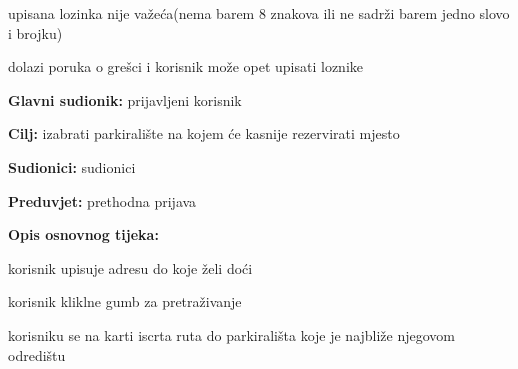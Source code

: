 \begin{packed_item}
\begin{packed_item}
\begin{packed_enum}
							\end{packed_enum}
							
							\item[4.b] upisana lozinka nije važeća(nema barem 8 znakova ili ne sadrži barem jedno slovo i brojku)
							
							\begin{packed_enum}
								
								\item dolazi poruka o grešci i korisnik može opet upisati loznike
								
							\end{packed_enum}
							
						\end{packed_item}
					\end{packed_item}
					
					\noindent {}
					\begin{packed_item}
						
						\item \textbf{Glavni sudionik: }prijavljeni korisnik
						\item  \textbf{Cilj:} izabrati parkiralište na kojem će kasnije rezervirati mjesto
						\item  \textbf{Sudionici:} sudionici
						\item  \textbf{Preduvjet:} prethodna prijava
						\item  \textbf{Opis osnovnog tijeka:}
						
						\item[] \begin{packed_enum}
							
							\item korisnik upisuje adresu do koje želi doći
							\item korisnik kliklne gumb za pretraživanje
							\item korisniku se na karti iscrta ruta do parkirališta koje je najbliže njegovom odredištu
						
						\end{packed_enum}
						
						 
					\end{packed_item}
					
